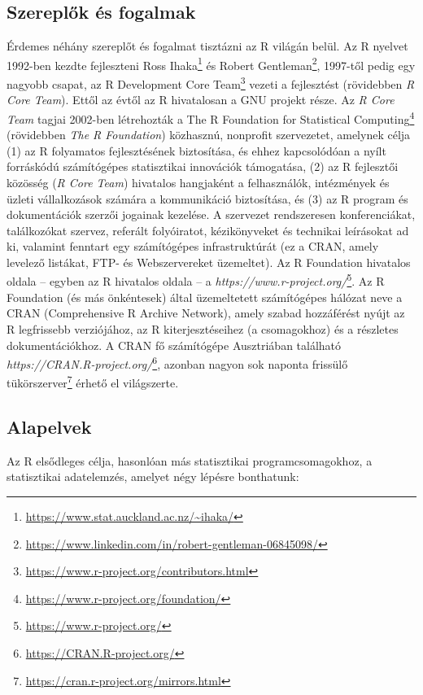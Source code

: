 \documentclass[
]{book}
\DeclareRobustCommand{\href}[2]{#2\footnote{\url{#1}}}
\begin{document}
\hypertarget{szereplux151k-uxe9s-fogalmak}{%
\subsection{Szereplők és fogalmak}\label{szereplux151k-uxe9s-fogalmak}}

Érdemes néhány szereplőt és fogalmat tisztázni az R világán belül. Az R nyelvet 1992-ben kezdte fejleszteni \href{https://www.stat.auckland.ac.nz/~ihaka/}{Ross Ihaka} és \href{https://www.linkedin.com/in/robert-gentleman-06845098/}{Robert Gentleman}, 1997-től pedig egy nagyobb csapat, az \href{https://www.r-project.org/contributors.html}{R Development Core Team} vezeti a fejlesztést (rövidebben \emph{R Core Team}). Ettől az évtől az R hivatalosan a GNU projekt része. Az \emph{R Core Team} tagjai 2002-ben létrehozták a \href{https://www.r-project.org/foundation/}{The R Foundation for Statistical Computing} (rövidebben \emph{The R Foundation}) közhasznú, nonprofit szervezetet, amelynek célja (1) az R folyamatos fejlesztésének biztosítása, és ehhez kapcsolódóan a nyílt forráskódú számítógépes statisztikai innovációk támogatása, (2) az R fejlesztői közösség (\emph{R Core Team}) hivatalos hangjaként a felhasználók, intézmények és üzleti vállalkozások számára a kommunikáció biztosítása, és (3) az R program és dokumentációk szerzői jogainak kezelése. A szervezet rendszeresen konferenciákat, találkozókat szervez, referált folyóiratot, kézikönyveket és technikai leírásokat ad ki, valamint fenntart egy számítógépes infrastruktúrát (ez a CRAN, amely levelező listákat, FTP- és Webszervereket üzemeltet). Az R Foundation hivatalos oldala -- egyben az R hivatalos oldala -- a \href{https://www.r-project.org/}{\emph{https://www.r-project.org/}}. Az R Foundation (és más önkéntesek) által üzemeltetett számítógépes hálózat neve a CRAN (Comprehensive R Archive Network), amely szabad hozzáférést nyújt az R legfrissebb verziójához, az R kiterjesztéseihez (a csomagokhoz) és a részletes dokumentációkhoz. A CRAN fő számítógépe Ausztriában található \href{https://CRAN.R-project.org/}{\emph{https://CRAN.R-project.org/}}, azonban nagyon sok naponta frissülő \href{https://cran.r-project.org/mirrors.html}{tükörszerver} érhető el világszerte.

\hypertarget{alapelvek}{%
\subsection{Alapelvek}\label{alapelvek}}

Az R elsődleges célja, hasonlóan más statisztikai programcsomagokhoz, a statisztikai adatelemzés, amelyet négy lépésre bonthatunk:
\end{document}
